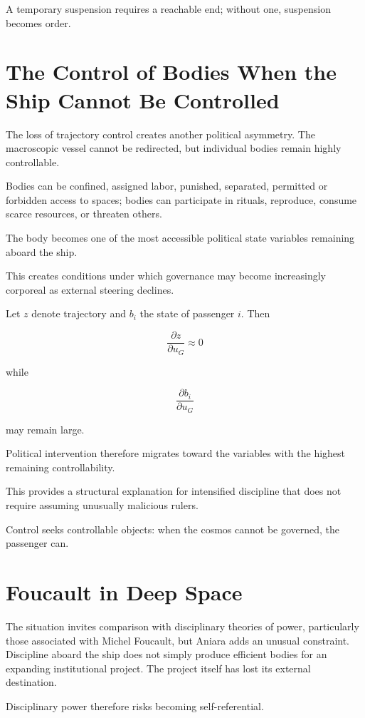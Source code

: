 \documentclass[11pt,oneside]{book}
\theoremstyle{definition}
\theoremstyle{remark}
\begin{document}
A temporary suspension requires a reachable end; without one, suspension becomes order.

\section{The Control of Bodies When the Ship Cannot Be Controlled}

The loss of trajectory control creates another political asymmetry. The macroscopic vessel cannot be redirected, but individual bodies remain highly controllable.

Bodies can be confined, assigned labor, punished, separated, permitted or forbidden access to spaces; bodies can participate in rituals, reproduce, consume scarce resources, or threaten others.

The body becomes one of the most accessible political state variables remaining aboard the ship.

This creates conditions under which governance may become increasingly corporeal as external steering declines.

Let \(z\) denote trajectory and \(b_i\) the state of passenger \(i\). Then

\[
\frac{\partial z}{\partial u_G}\approx0
\]

while

\[
\frac{\partial b_i}{\partial u_G}
\]

may remain large.

Political intervention therefore migrates toward the variables with the highest remaining controllability.

This provides a structural explanation for intensified discipline that does not require assuming unusually malicious rulers.

Control seeks controllable objects: when the cosmos cannot be governed, the passenger can.

\section{Foucault in Deep Space}

The situation invites comparison with disciplinary theories of power, particularly those associated with Michel Foucault, but Aniara adds an unusual constraint. Discipline aboard the ship does not simply produce efficient bodies for an expanding institutional project. The project itself has lost its external destination.

Disciplinary power therefore risks becoming self-referential.
\end{document}

